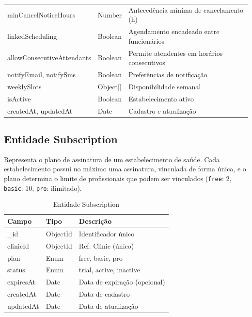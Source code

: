 \begin{table}[H]
\begin{tabular}{p{3.8cm}p{2.5cm}p{5.2cm}}
    minCancelNoticeHours      & Number   & Antecedência mínima de
                                           cancelamento (h) \\
    linkedScheduling          & Boolean  & Agendamento encadeado
                                           entre funcionários \\
    allowConsecutiveAttendants & Boolean & Permite atendentes em
                                           horários consecutivos \\
    notifyEmail, notifySms    & Boolean  & Preferências de notificação \\
    weeklySlots               & Object[] & Disponibilidade semanal \\
    isActive                  & Boolean  & Estabelecimento ativo \\
    createdAt, updatedAt      & Date     & Cadastro e atualização \\
    \bottomrule
  \end{tabular}
\end{table}

\subsection{Entidade Subscription}
\label{subsec:entity-subscription}

Representa o plano de assinatura de um
estabelecimento de saúde. Cada estabelecimento
possui no máximo uma assinatura, vinculada de forma
única, e o plano determina o limite de profissionais
que podem ser vinculados (\texttt{free}: 2,
\texttt{basic}: 10, \texttt{pro}: ilimitado).

\begin{table}[H]
  \centering
  \caption{Entidade Subscription}
  \label{tab:entity-subscription}
  \begin{tabular}{p{3.8cm}p{2.5cm}p{5.2cm}}
    \toprule
    \textbf{Campo} &
    \textbf{Tipo} &
    \textbf{Descrição} \\
    \midrule
    \_id        & ObjectId & Identificador único \\
    clinicId    & ObjectId & Ref: Clinic (único) \\
    plan        & Enum     & free, basic, pro \\
    status      & Enum     & trial, active, inactive \\
    expiresAt   & Date     & Data de expiração (opcional) \\
    createdAt   & Date     & Data de cadastro \\
    updatedAt   & Date     & Data de atualização \\
    \bottomrule
  \end{tabular}
\end{table}

